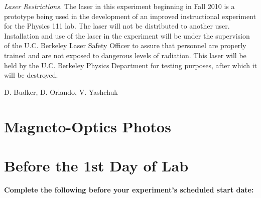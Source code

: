 \documentclass{../lab}
\begin{document}
\emph{Laser Restrictions.} The laser in this experiment beginning in Fall 2010 is a prototype being used in the development of an improved instructional experiment for the Physics 111 lab. The laser will not be distributed to another user. Installation and use of the laser in the experiment will be under the supervision of the U.C. Berkeley Laser Safety Officer to assure that personnel are properly trained and are not exposed to dangerous levels of radiation. This laser will be held by the U.C. Berkeley Physics Department for testing purposes, after which it will be destroyed.

D. Budker, D. Orlando, V. Yashchuk

\section{Magneto-Optics Photos}

\noindent

\noindent

\section{Before the 1st Day of Lab}

\textbf{Complete the following before your experiment's scheduled start date:}
\end{document}
